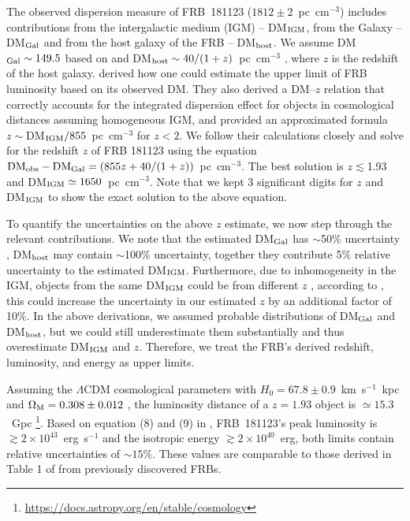 The observed dispersion measure of FRB~181123 ($1812\pm 2$~pc~cm$^{-3}$) includes  contributions from the intergalactic medium (IGM) -- DM$_{\rm IGM}$, from the Galaxy -- DM$_{\rm Gal}$ and from the host galaxy of the FRB -- DM$_{\rm host}$. We assume DM$_{\rm Gal}\sim149.5$ based on \citet{ymw16} and DM$_{\rm host}\sim 40/(1+z)$~pc~cm$^{-3}$ \citep{xh15,yz16}, where $z$ is the redshift of the host galaxy. 
\citet{zhang18} derived how one could estimate the upper limit of FRB luminosity based on its observed DM. They also derived a DM--$z$ relation that correctly accounts for the integrated dispersion effect for objects in cosmological distances assuming homogeneous IGM, and provided an approximated formula $z\sim$DM$_{\rm IGM} / 855$~pc~cm$^{-3}$ for $z<2$.
We follow their calculations closely and solve for the redshift $z$ of FRB 181123 using the equation ${\rm DM_{obs}-DM_{Gal}} = (855z + 40/(1+z))$~pc~cm$^{-3}$.
The best solution is $z\lesssim $1.93 and DM$_{\rm IGM}\simeq1650$~pc~cm$^{-3}$. 
Note that we kept 3 significant digits for $z$ and DM$_{\rm IGM}$ to show the exact solution to the above equation. 


To quantify the uncertainties on the
above $z$ estimate, we now step through the relevant contributions.
We note that the estimated DM$_{\rm Gal}$ has $\sim$50\% uncertainty \citep{ymw16}, DM$_{\rm host}$ may contain $\sim $100\% uncertainty, together they contribute 5\% relative uncertainty to the estimated DM$_{\rm IGM}$.
Furthermore, due to inhomogeneity in the IGM, objects from the same DM$_{\rm IGM}$ could be from different $z$ \citep{plm+19}, according to \citet{wmb18}, this could increase the uncertainty in our estimated $z$ by an additional factor of 10\%.
In the above derivations, we assumed probable distributions of DM$_{\rm Gal}$ and DM$_{\rm host}$, but we could still underestimate them substantially and thus overestimate DM$_{\rm IGM}$ and $z$. 
Therefore, we treat the FRB's derived redshift, luminosity, and energy as upper limits.

Assuming the $\Lambda$CDM cosmological parameters with $H_0=67.8\pm0.9$~km~s$^{-1}$~kpc %
and $\Omega_{\rm M} =0.308\pm0.012$ \citep{planck16}, the luminosity distance of a $z=1.93$ object is $\simeq15.3$~Gpc \footnote{\url{https://docs.astropy.org/en/stable/cosmology}}.
Based on equation (8) and (9) in \citet{zhang18}, FRB~181123's peak luminosity is $\gtrsim 2\times10^{43}$~erg~s$^{-1}$ and the isotropic energy $\gtrsim 2\times10^{40}$~erg, both limits contain relative uncertainties of $\sim 15$\%.
These values are comparable to those derived in Table 1 of \citet{zhang18} from previously discovered FRBs.


